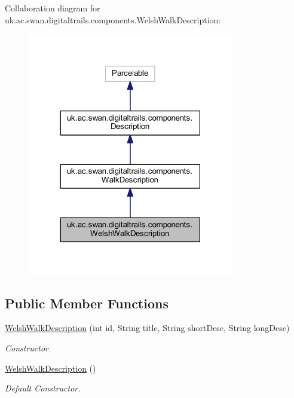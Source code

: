 Collaboration diagram for uk.\+ac.\+swan.\+digitaltrails.\+components.\+Welsh\+Walk\+Description\+:\nopagebreak
\begin{figure}[H]
\begin{center}
\leavevmode
\includegraphics[width=255pt]{classuk_1_1ac_1_1swan_1_1digitaltrails_1_1components_1_1_welsh_walk_description__coll__graph}
\end{center}
\end{figure}
\subsection*{Public Member Functions}
\begin{DoxyCompactItemize}
\item 
\hyperlink{classuk_1_1ac_1_1swan_1_1digitaltrails_1_1components_1_1_welsh_walk_description_a2d25bb55ff7f5e41fe86f5a155aeeae9}{Welsh\+Walk\+Description} (int id, String title, String short\+Desc, String long\+Desc)
\begin{DoxyCompactList}\small\item\em Constructor. \end{DoxyCompactList}\item 
\hyperlink{classuk_1_1ac_1_1swan_1_1digitaltrails_1_1components_1_1_welsh_walk_description_a27635e3b6262e73d473ddaa9ffccad91}{Welsh\+Walk\+Description} ()
\begin{DoxyCompactList}\small\item\em Default Constructor. \end{DoxyCompactList}\end{DoxyCompactItemize}

